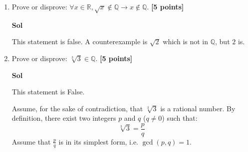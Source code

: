 \documentclass{article}
\begin{document}
\begin{enumerate}
\begin{enumerate}
    \item We focus on the terms $a_2 k^2 + a_1 k$, which are $24k^2 + 8k$. We want to rewrite this in the form $bk^2 + c(k^2 + k)$. Notice that $24k^2$ can be split into $16k^2 + 8k^2$. \begin{equation}
        \begin{split}
            24k^2 + 8k &= 16k^2 + 8k^2 + 8k\\
            &= 16k^2 + 8(k^2 + k)
        \end{split}
    \end{equation} Here, $b = 16$ and $c = 8$.
    \item Since both terms are divisible by 8, the whole term is divisible by 8.
    \item \begin{equation}
    \begin{split}
        16k^4 + 32k^3 + 24k^2 + 8k &= 16k^4 + 32k^3 +16k^2 + 8k^2 + 8k\\
        &= 16(k^4 + 2k^3 +k^2) + 8(k^2 + k)\\
        &= 16(k^4 + 2k^3 +k^2) + 8(k+1)(k)\\
    \end{split}    \end{equation}
    since \((k+1)(k)\) is even, both terms are divisible by 16 and thus the original expression \(n^4-1\) is divisible by 16. 
\end{enumerate}



\item Prove or disprove:  $\forall x \in \mathbb{R}, \sqrt{x} \notin \mathbb{Q} \rightarrow x \notin \mathbb{Q} $.   \textbf{[5 points]}

\textbf{Sol}

This statement is false. A counterexample is \(\sqrt{2}\) which is not in \(\mathbb Q\), but \(2\) is. 

\item Prove or disprove: $ \sqrt[3]{3} \in \mathbb{Q}$.  \textbf{[5 points]} %

\textbf{Sol}

This statement is False.

Assume, for the sake of contradiction, that $\sqrt[3]{3}$ is a rational number. By definition, there exist two integers $p$ and $q$ ($q \neq 0$) such that:$$\sqrt[3]{3} = \frac{p}{q}$$
Assume that \(\frac{p}{q}\) is in its simplest form, i.e. \(\gcd(p,q) = 1\).


\end{enumerate}
\end{document}
